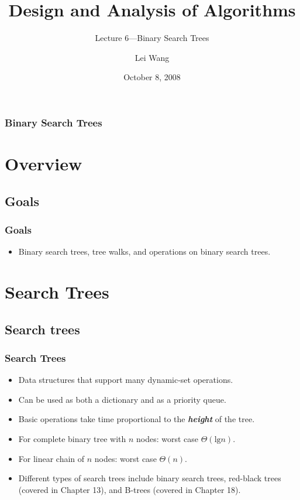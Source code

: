 \documentclass[notes,serif]{beamer}
\title{Design and Analysis of Algorithms}
\subtitle{Lecture 6---Binary Search Trees}
\author{Lei Wang}
\institute{Dalian University of Technology}
\date{October 8, 2008}
\begin{document}
\begin{frame}
  \titlepage
\end{frame}

\begin{frame}
  \frametitle{Binary Search Trees}
  \tableofcontents
\end{frame}

\section{Overview}
\subsection{Goals}

\begin{frame}
\frametitle{Goals}
\begin{itemize}
    \item Binary search trees, tree walks, and operations on binary search trees.
\end{itemize}
\end{frame}

\section{Search Trees}

\subsection{Search trees}

\begin{frame}
  \frametitle{Search Trees}
    \begin{itemize}
      \item Data structures that support many dynamic-set operations.
      \item Can be used as both a dictionary and as a priority queue.
      \item Basic operations take time proportional to the {\bf\em height} of the tree.
      \item For complete binary tree with $n$ nodes: worst case $\Theta(\text{lg}n)$.
      \item For linear chain of $n$ nodes: worst case $\Theta(n)$.
      \item Different types of search trees include binary search trees, red-black trees
(covered in Chapter 13), and B-trees (covered in Chapter 18).
    \end{itemize}
\end{frame}
\end{document}
